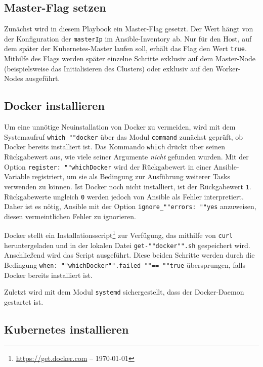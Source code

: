 \subsection{Master-Flag setzen}\label{subsec:master-flag-setzen}

Zunächst wird in diesem Playbook ein Master-Flag gesetzt.
Der Wert hängt von der Konfiguration der \texttt{masterIp} im Ansible-Inventory ab.
Nur für den Host, auf dem später der Kubernetes-Master laufen soll, erhält das Flag den Wert \texttt{true}.
Mithilfe des Flags werden später einzelne Schritte exklusiv auf dem Master-Node (beispielsweise das Initialisieren des Clusters) oder exklusiv auf den Worker-Nodes ausgeführt.

\subsection{Docker installieren}\label{subsec:docker-installieren}

Um eine unnötige Neuinstallation von Docker zu vermeiden, wird mit dem Systemaufruf \texttt{which ""docker} über das Modul \texttt{command} zunächst geprüft, ob Docker bereits installiert ist.
Das Kommando \texttt{which} drückt über seinen Rückgabewert aus, wie viele seiner Argumente \emph{nicht} gefunden wurden.
Mit der Option \texttt{register: ""whichDocker} wird der Rückgabewert in einer Ansible-Variable registriert, um sie als Bedingung zur Ausführung weiterer Tasks verwenden zu können.
Ist Docker noch nicht installiert, ist der Rückgabewert \texttt{1}.
Rückgabewerte ungleich \texttt{0} werden jedoch von Ansible als Fehler interpretiert.
Daher ist es nötig, Ansible mit der Option \texttt{ignore\_""errors: ""yes} anzuweisen, diesen vermeintlichen Fehler zu ignorieren.

Docker stellt ein Installationsscript\footnote{\url{https://get.docker.com} -- \today} zur Verfügung, das mithilfe von \texttt{curl} heruntergeladen und in der lokalen Datei \texttt{get-""docker"".sh} gespeichert wird.
Anschließend wird das Script ausgeführt.
Diese beiden Schritte werden durch die Bedingung \texttt{when: ""whichDocker"".failed ""== ""true} übersprungen, falls Docker bereits installiert ist.

Zuletzt wird mit dem Modul \texttt{systemd} sichergestellt, dass der Docker-Daemon gestartet ist.

\subsection{Kubernetes installieren}\label{subsec:kubernetes-installieren}

